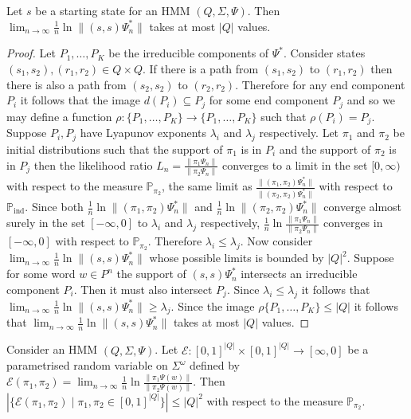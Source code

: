 \documentclass[a4paper,UKenglish,cleveref, autoref,mathscr]{lipics-v2019}
\newcommand{\Epsilon}{\mathcal{E}}
\newcommand{\PP}{\mathbb{P}}
\newcommand{\1}{\mathbbm{1}}
\begin{document}
\begin{lemma}\label{Qboundfordenominator}
Let $s$ be a starting state for an HMM $(Q, \Sigma, \Psi)$. Then $\lim_{n \rightarrow \infty} \frac1n \ln \|  (s, s) \Psi_n^* \|$ takes at most $|Q|$ values.
\end{lemma}

\begin{proof}
Let $P_1, \dots, P_K$ be the irreducible components of $\Psi^*$. Consider states $(s_1, s_2), (r_1, r_2) \in Q \times Q$. If there is a path from $(s_1, s_2)$ to $(r_1, r_2)$ then there is also a path from $(s_2, s_2)$ to $(r_2, r_2)$. Therefore for any end component $P_i$ it follows that the image $d(P_i) \subseteq P_j$ for some end component $P_j$ and so we may define a function $\rho : \{ P_1, \dots, P_K \} \rightarrow \{ P_1, \dots, P_K \}$ such that $\rho(P_i) = P_j$. Suppose $P_i, P_j$ have Lyapunov exponents $\lambda_i$ and $\lambda_j$ respectively. Let $\pi_1$ and $\pi_2$ be initial distributions such that the support of $\pi_1$ is in $P_i$ and the support of $\pi_2$ is in $P_j$ then the likelihood ratio $L_n = \frac{\| \pi_1 \Psi_n \|}{\| \pi_2 \Psi_n \|}$ converges to a limit in the set $[0,\infty)$ with respect to the measure $\PP_{\pi_2}$, the same limit as $\frac{\| (\pi_1, \pi_2) \Psi_n^* \|}{\| (\pi_2, \pi_2) \Psi_n^* \|}$ with respect to $\PP_\text{ind}$. Since both $\frac{1}{n} \ln \| (\pi_1, \pi_2) \Psi_n^* \|$ and $\frac{1}{n} \ln \| (\pi_2, \pi_2) \Psi_n^* \|$ converge almost surely in the set $[-\infty, 0]$ to $\lambda_i$ and $\lambda_j$ respectively, $\frac{1}{n} \ln \frac{\| \pi_1 \Psi_n \|}{\| \pi_2 \Psi_n \|}$ converges in $[-\infty, 0]$ with respect to $\PP_{\pi_2}$. Therefore $\lambda_i \leq \lambda_j$.
Now consider $\lim_{n \rightarrow \infty} \frac1n \ln \|  (s, s) \Psi_n^* \|$ whose possible limits is bounded by $|Q|^2$. Suppose for some word $w \in P^n$ the support of $(s, s) \Psi_n^*$ intersects an irreducible component $P_i$. Then it must also intersect $P_j$. Since $\lambda_i \leq \lambda_j$ it follows that $\lim_{n \rightarrow \infty} \frac1n \ln \|  (s, s) \Psi_n^* \| \geq \lambda_j$. Since the image $\rho \{P_1, \dots, P_K \} \leq |Q|$ it follows that $\lim_{n \rightarrow \infty} \frac1n \ln \|  (s, s) \Psi_n^* \|$ takes at most $|Q|$ values.
\end{proof}

\begin{lemma}
Consider an HMM $(Q, \Sigma, \Psi)$. Let $\Epsilon : [0,1]^{|Q|} \times [0,1]^{|Q|} \rightarrow [\infty, 0]$ be a parametrised random variable on $\Sigma^\omega$ defined by $\Epsilon(\pi_1, \pi_2) = \lim_{n \rightarrow \infty} \frac1n \ln \frac{\| \pi_1 \Psi(w) \|}{\|\pi_2 \Psi(w) \|}$. Then $|\{\Epsilon(\pi_1, \pi_2) \mid \pi_1, \pi_2 \in [0,1]^{|Q|}\} | \leq |Q|^2$ with respect to the measure $\PP_{\pi_2}$.
\end{lemma}
\end{document}
